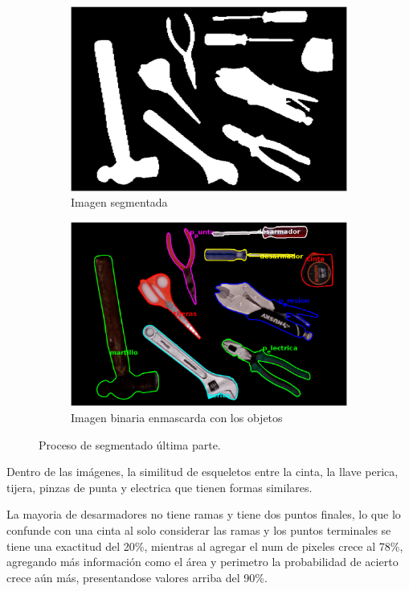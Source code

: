 \documentclass[a4paper, 11pt]{article}
\begin{document}
\begin{figure}[h]
  \begin{subfigure}{0.5\linewidth}
    \includegraphics[width=\linewidth]{paso9}
    \caption{Imagen segmentada}
    \label{fig:1a}
  \end{subfigure}\hfill
  \begin{subfigure}{0.5\linewidth}
    \includegraphics[width=\linewidth]{paso10}
    \caption{Imagen binaria enmascarda con los objetos}
    \label{fig:1a}
  \end{subfigure}
  \caption{Proceso de segmentado última parte.}
  \label{fig:1}
\end{figure}


Dentro de las imágenes, la similitud de esqueletos entre la cinta, la llave perica, tijera, pinzas de punta y electrica que tienen formas similares.

La mayoria de desarmadores no tiene ramas y tiene dos puntos finales, lo que lo confunde con una cinta al solo considerar las ramas y los puntos terminales se tiene una exactitud del 20\%, mientras al agregar el num de pixeles crece al 78\%, agregando más información como el área y perimetro la probabilidad de acierto crece aún más, presentandose valores arriba del 90\%.
\end{document}
